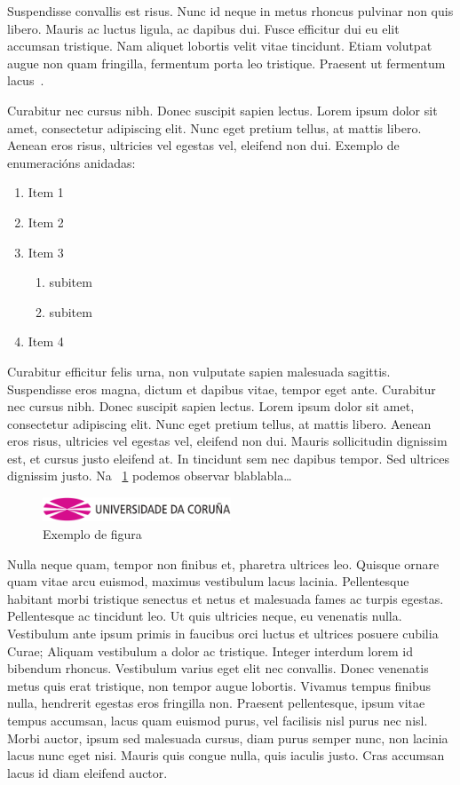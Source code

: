 \documentclass{pfc}
\begin{document}
Suspendisse convallis est risus. Nunc id neque in metus rhoncus
pulvinar non quis libero. Mauris ac luctus ligula, ac dapibus
dui. Fusce efficitur dui eu elit accumsan tristique. Nam aliquet
lobortis velit vitae tincidunt. Etiam volutpat augue non quam
fringilla, fermentum porta leo tristique. Praesent ut fermentum
lacus~\cite{HenessyPatterson, algorithms}.

Curabitur nec cursus nibh. Donec suscipit sapien lectus. Lorem ipsum
dolor sit amet, consectetur adipiscing elit. Nunc eget pretium tellus,
at mattis libero. Aenean eros risus, ultricies vel egestas vel,
eleifend non dui. Exemplo de enumeracións anidadas:
\begin{enumerate}
\item Item 1
\item Item 2
\item Item 3
  \begin{enumerate}
  \item subitem
  \item subitem
  \end{enumerate}
\item Item 4
\end{enumerate}

Curabitur efficitur felis urna, non vulputate sapien malesuada
sagittis. Suspendisse eros magna, dictum et dapibus vitae, tempor eget
ante. Curabitur nec cursus nibh. Donec suscipit sapien lectus. Lorem
ipsum dolor sit amet, consectetur adipiscing elit. Nunc eget pretium
tellus, at mattis libero. Aenean eros risus, ultricies vel egestas
vel, eleifend non dui. Mauris sollicitudin dignissim est, et cursus
justo eleifend at. In tincidunt sem nec dapibus tempor. Sed ultrices
dignissim justo.  Na \figurename~\ref{fig:exemplo} podemos observar
blablabla\ldots

\begin{figure}
  \centering
  \includegraphics[width=0.5\textwidth]{img/logo_udc}
  \caption{Exemplo de figura}
  \label{fig:exemplo}
\end{figure}

Nulla neque quam, tempor non finibus et, pharetra ultrices
leo. Quisque ornare quam vitae arcu euismod, maximus vestibulum lacus
lacinia. Pellentesque habitant morbi tristique senectus et netus et
malesuada fames ac turpis egestas. Pellentesque ac tincidunt leo. Ut
quis ultricies neque, eu venenatis nulla. Vestibulum ante ipsum primis
in faucibus orci luctus et ultrices posuere cubilia Curae; Aliquam
vestibulum a dolor ac tristique. Integer interdum lorem id bibendum
rhoncus. Vestibulum varius eget elit nec convallis. Donec venenatis
metus quis erat tristique, non tempor augue lobortis. Vivamus tempus
finibus nulla, hendrerit egestas eros fringilla non. Praesent
pellentesque, ipsum vitae tempus accumsan, lacus quam euismod purus,
vel facilisis nisl purus nec nisl. Morbi auctor, ipsum sed malesuada
cursus, diam purus semper nunc, non lacinia lacus nunc eget
nisi. Mauris quis congue nulla, quis iaculis justo. Cras accumsan
lacus id diam eleifend auctor.
\end{document}
